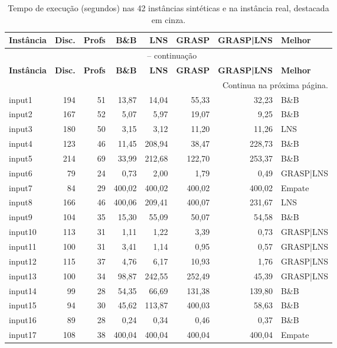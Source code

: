\begingroup
\setlength{\tabcolsep}{3pt}
\scriptsize
\begin{longtable}{@{}lrrrrrrl@{}}
\caption{Tempo de execução (segundos) nas 42 instâncias sintéticas e na instância real, destacada em cinza.}\label{tab:geral_tempo}\\
\toprule
\textbf{Instância} & \textbf{Disc.} & \textbf{Profs} & \textbf{B\&B} & \textbf{LNS} & \textbf{GRASP} & \textbf{GRASP|LNS} & \textbf{Melhor} \\
\midrule
\endfirsthead
\multicolumn{8}{c}{\tablename\ \thetable{} -- continuação}\\
\toprule
\textbf{Instância} & \textbf{Disc.} & \textbf{Profs} & \textbf{B\&B} & \textbf{LNS} & \textbf{GRASP} & \textbf{GRASP|LNS} & \textbf{Melhor} \\
\midrule
\endhead
\midrule
\multicolumn{8}{r}{Continua na próxima página.}\\
\endfoot
\bottomrule
\endlastfoot
input1 & 194 & 51 & 13,87 & 14,04 & 55,33 & 32,23 & B\&B \\
input2 & 167 & 52 & 5,07 & 5,97 & 19,07 & 9,25 & B\&B \\
input3 & 180 & 50 & 3,15 & 3,12 & 11,20 & 11,26 & LNS \\
input4 & 123 & 46 & 11,45 & 208,94 & 38,47 & 228,73 & B\&B \\
input5 & 214 & 69 & 33,99 & 212,68 & 122,70 & 253,37 & B\&B \\
input6 & 79 & 24 & 0,73 & 2,00 & 1,79 & 0,49 & GRASP{|}LNS \\
input7 & 84 & 29 & 400,02 & 400,02 & 400,02 & 400,02 & Empate \\
input8 & 166 & 46 & 400,06 & 209,41 & 400,07 & 231,67 & LNS \\
input9 & 104 & 35 & 15,30 & 55,09 & 50,07 & 54,58 & B\&B \\
input10 & 113 & 31 & 1,11 & 1,22 & 3,39 & 0,73 & GRASP{|}LNS \\
input11 & 100 & 31 & 3,41 & 1,14 & 0,95 & 0,57 & GRASP{|}LNS \\
input12 & 115 & 37 & 4,76 & 6,17 & 10,93 & 1,76 & GRASP{|}LNS \\
input13 & 100 & 34 & 98,87 & 242,55 & 252,49 & 45,39 & GRASP{|}LNS \\
input14 & 99 & 28 & 54,35 & 66,69 & 131,38 & 139,80 & B\&B \\
input15 & 94 & 30 & 45,62 & 113,87 & 400,03 & 58,63 & B\&B \\
input16 & 89 & 28 & 0,24 & 0,34 & 0,46 & 0,37 & B\&B \\
input17 & 108 & 38 & 400,04 & 400,04 & 400,04 & 400,04 & Empate \\

\end{longtable}
